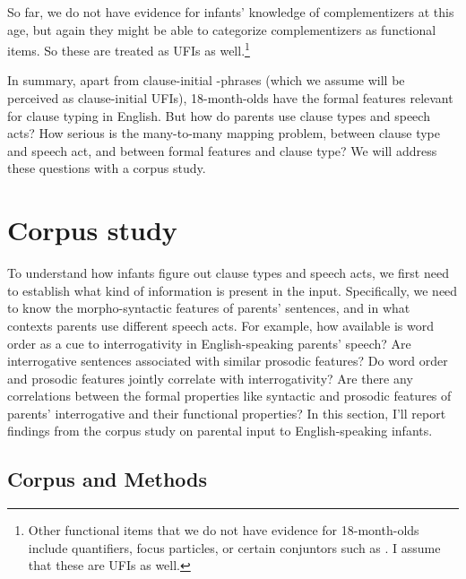  So far, we do not have evidence for infants' knowledge of complementizers at this age, but again they might be able to categorize complementizers as functional items. So these are treated as UFIs as well.\footnote{ Other functional items that we do not have evidence for 18-month-olds include quantifiers, focus particles, or certain conjuntors such as . I assume that these are UFIs as well. } %





In summary, apart from clause-initial \twh-phrases (which we assume will be perceived as clause-initial UFIs), 18-month-olds have the formal features relevant for clause typing in English. But how do parents use clause types and speech acts? How serious is the many-to-many mapping problem, between clause type and speech act, and between formal features and clause type? We will address these questions with a corpus study. %

\section{Corpus study}
\label{sec:engcl:corpus}
To understand how infants figure out clause types and speech acts, we first need to establish what kind of information is present in the input. Specifically, we need to know the morpho-syntactic features of parents’ sentences, and in what contexts parents use different speech acts. For example, how available is word order as a cue to interrogativity in English-speaking parents’ speech? Are interrogative sentences associated with similar prosodic features? Do word order and prosodic features jointly correlate with interrogativity? Are there any correlations between the formal properties like syntactic and prosodic features of parents’ interrogative and their functional properties? In this section, I’ll report findings from the corpus study on parental input to English-speaking infants. 


\subsection{Corpus and Methods}
\label{sec:engcl:corpus:methods}


